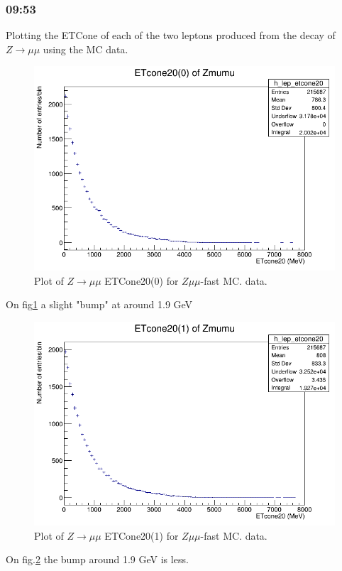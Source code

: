\subsubsection*{09:53}
Plotting the ETCone of each of the two leptons produced from the decay of $Z \rightarrow \mu \mu$ using the MC data.
\begin{figure}[h!]
    \centering
	\includegraphics[width=0.85\linewidth]{plots/16-02-2021/Zmumu-fast_ETcone(0)_0-8GeV_16-02-21_09-54.png}
	\caption{Plot of  $Z \rightarrow \mu\mu$ ETCone20(0) for $Z\mu\mu$-fast MC.  data.}\label{fig:Zmumu-fast_ETcone(0)_0-8GeV_16-02-21_09-54}
\end{figure}
On fig\ref{fig:Zmumu-fast_ETcone(0)_0-8GeV_16-02-21_09-54} a slight "bump" at around 1.9 GeV 

\begin{figure}[h!]
    \centering
	\includegraphics[width=0.85\linewidth]{plots/16-02-2021/Zmumu-fast_ETcone(1)_0-8GeV_16-02-21_09-56.png}
	\caption{Plot of  $Z \rightarrow \mu\mu$ ETCone20(1) for $Z\mu\mu$-fast MC.  data.}\label{fig:Zmumu-fast_ETcone(1)_0-8GeV_16-02-21_09-56}
\end{figure}
On fig.\ref{fig:Zmumu-fast_ETcone(1)_0-8GeV_16-02-21_09-56} the bump around 1.9 GeV is less.

